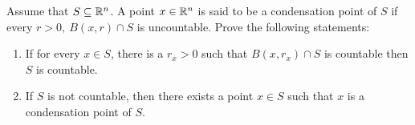 Assume that $S \subseteq \mathbb{R}^n$. A point $x \in \mathbb{R}^n$ is said to be a condensation point of $S$ if every $r>0,~ B(x,r) \cap S$ is uncountable. Prove the following statements:

\begin{enumerate}
	\item If for every $x \in S$, there is a $r_x > 0$ such that $B(x,r_x) \cap S$ is countable then $S$ is countable.
	\item If $S$ is not countable, then there exists a point $x \in S$ such that $x$ is a condensation point of $S$.
\end{enumerate}